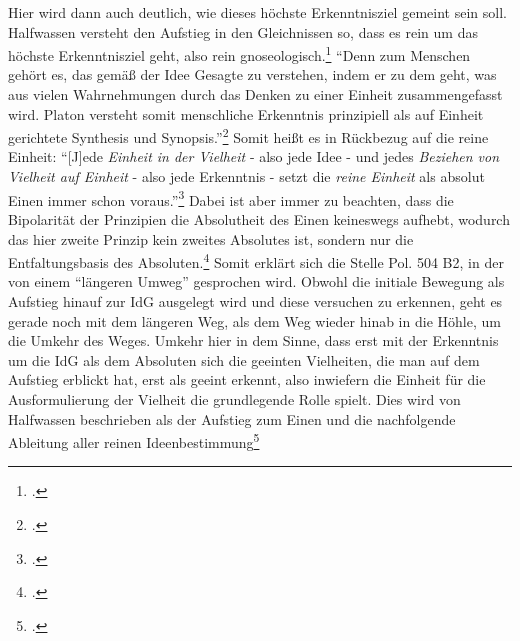 Hier wird dann auch deutlich, wie dieses höchste Erkenntnisziel gemeint sein soll.\\
Halfwassen versteht den Aufstieg in den Gleichnissen so, dass es rein um das höchste Erkenntnisziel geht, also rein gnoseologisch.\footcite[vgl.][S. 226]{halfwassenaufstieg2006}
\enquote{Denn zum Menschen gehört es, das gemäß der Idee Gesagte zu verstehen, indem er zu dem geht, was aus vielen Wahrnehmungen durch das Denken zu einer Einheit zusammengefasst wird. Platon versteht somit menschliche Erkenntnis prinzipiell als auf Einheit gerichtete Synthesis und Synopsis.}\footcite[][S. 228]{halfwassenaufstieg2006}
Somit heißt es in Rückbezug auf die reine Einheit:
\enquote{[J]ede \emph{Einheit in der Vielheit} - also jede Idee - und jedes \emph{Beziehen von Vielheit auf Einheit} - also jede Erkenntnis - setzt die \emph{reine Einheit} als absolut Einen immer schon voraus.}\footcite[][S. 230]{halfwassenaufstieg2006}
Dabei ist aber immer zu beachten, dass die Bipolarität der Prinzipien die Absolutheit des Einen keineswegs aufhebt, wodurch das hier zweite Prinzip kein zweites Absolutes ist, sondern nur die Entfaltungsbasis des Absoluten.\footcite[vgl.][S. 53]{HalfwassenGeistmetaphysik}
Somit erklärt sich die Stelle Pol. 504 B2, in der von einem \enquote{längeren Umweg} gesprochen wird. Obwohl die initiale Bewegung als Aufstieg hinauf zur IdG ausgelegt wird und diese versuchen zu erkennen, geht es gerade noch mit dem längeren Weg, als dem Weg wieder hinab in die Höhle, um die Umkehr des Weges. Umkehr hier in dem Sinne, dass erst mit der Erkenntnis um die IdG als dem Absoluten sich die geeinten Vielheiten, die man auf dem Aufstieg erblickt hat, erst als geeint erkennt, also inwiefern die Einheit für die Ausformulierung der Vielheit die grundlegende Rolle spielt. Dies wird von Halfwassen beschrieben als der Aufstieg zum Einen und die nachfolgende Ableitung aller reinen Ideenbestimmung\footcite[vgl.][S. 231]{halfwassenaufstieg2006} 
